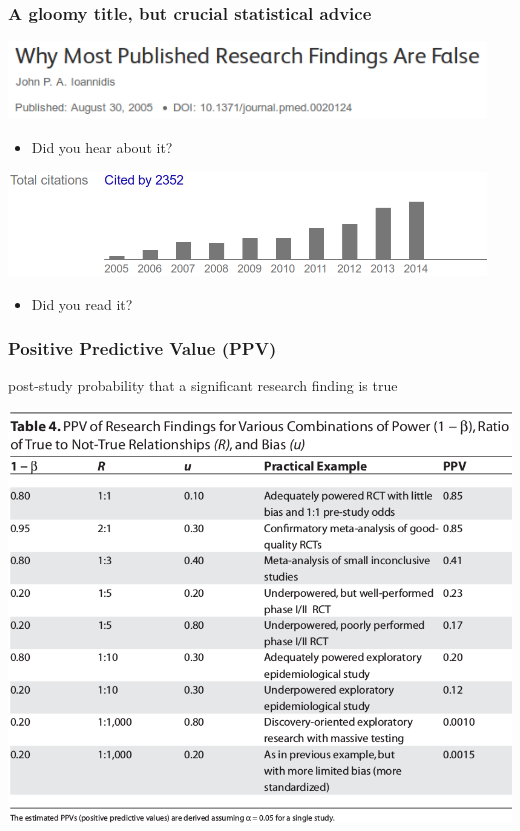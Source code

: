 \documentclass[c]{beamer} %
\begin{document}
\begin{frame}
  \frametitle{A gloomy title, but crucial statistical advice}
  \begin{center}
    \includegraphics[width=0.95\textwidth,height=0.90\textheight,keepaspectratio=true]{2005-08_JIoannidis_title}%
  \end{center}
  \pause
  \begin{itemize}
  \item Did you hear about it?
  \end{itemize}
  \bigskip
  \pause
  \begin{center}
    \includegraphics[width=0.95\textwidth,height=0.90\textheight,keepaspectratio=true]{2005-08_JIoannidis_citations}%
  \end{center}
  \pause
  \begin{itemize}
  \item Did you read it?
  \end{itemize}
\end{frame}

\begin{frame}
  \frametitle{Positive Predictive Value (PPV)}
  post-study probability that a significant research finding is true
  \begin{center}
    \includegraphics[width=\textwidth,height=0.7\textheight,keepaspectratio=true]{ioannidis_05_false-research-findings_tab4}%
  \end{center}
\end{frame}
\end{document}
